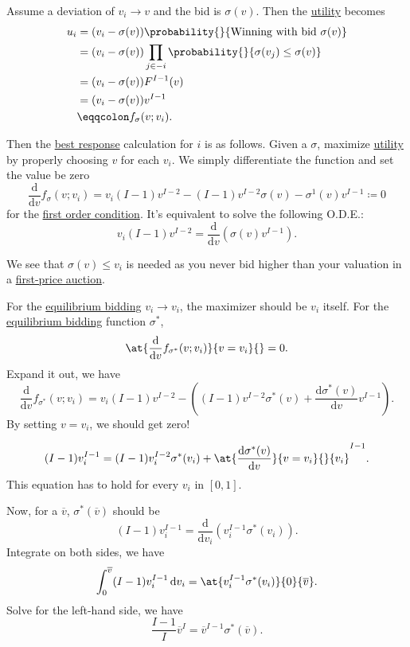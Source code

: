 Assume a deviation of \(v_{i}\to v\) and the bid is \(\sigma(v)\). Then the \hyperref[def:reward]{utility}  becomes
\[
	\begin{split}
		u_{i} &= (v_{i} - \sigma(v))\probability{}{ \text{Winning with bid } \sigma(v)}\\
		&= (v_{i} - \sigma(v))\prod\limits_{j\in -i}\probability{}{\sigma(v_{j})\leq \sigma(v)}\\
		&= (v_{i} - \sigma(v))F^{I-1}(v)\\
		&= (v_{i} - \sigma(v))v^{I-1}\\
		&\eqqcolon f_{\sigma}(v; v_{i}).
	\end{split}
\]

Then the \hyperref[def:best-response]{best response} calculation for \(i\) is as follows. Given a \(\sigma\), maximize \hyperref[def:reward]{utility}
by properly choosing \(v\) for each \(v_{i}\). We simply differentiate the function and set the value be zero
\[
	\frac{\mathrm{d}}{\mathrm{d}v}f_{\sigma}(v;v_{i}) = v_{i}(I - 1)v^{I-2} - (I - 1)v^{I-2}\sigma(v) - \sigma^1(v)v^{I-1} \coloneqq 0
\]
for the \underline{first order condition}. It's equivalent to solve the following O.D.E.:
\[
	v_{i}(I - 1)v^{I-2} = \frac{\mathrm{d}}{\mathrm{d}v} (\sigma(v)v^{I-1}).
\]

We see that \(\sigma(v)\leq v_{i}\) is needed as you never bid higher than your valuation in a \hyperref[eg:first-price-auction]{first-price auction}.

For the \hyperref[rmk:equilibrium-bidding]{equilibrium bidding} \(v_{i}\to v_{i}\), the maximizer should be \(v_{i}\) itself. For the
\hyperref[rmk:equilibrium-bidding]{equilibrium bidding} function \(\sigma^{\ast}\),
\[
	\at{\frac{\mathrm{d}}{\mathrm{d}v} f_{\sigma^{\ast}}(v;v_{i})}{v = v_{i}}{} = 0.
\]
Expand it out, we have
\[
	\frac{\mathrm{d}}{\mathrm{d}v} f_{\sigma^{\ast}}(v;v_{i}) = v_{i}(I - 1)v^{I-2} - \left((I - 1)v^{I-2}\sigma^{\ast}(v) + \frac{\mathrm{d}\sigma^{\ast}(v)}{\mathrm{d}v} v^{I-1}\right).
\]
By setting \(v = v_{i}\), we should get zero!

\[
	(I - 1)v_{i}^{I-1} = (I - 1)v_{i}^{I-2}\sigma^{\ast}(v_{i})+\at{\frac{\mathrm{d}\sigma^{\ast}(v)}{\mathrm{d}v}}{v = v_{i}}{}{v_{i}}^{I-1}.
\]
This equation has to hold for every \(v_{i}\) in \([0, 1]\).

Now, for a \(\overline{v}\), \(\sigma^{\ast}(\overline{v})\) should be
\[
	(I - 1)v_{i}^{I-1} = \frac{\mathrm{d}}{\mathrm{d}v_{i}} \left(v_{i}^{I-1}\sigma^{\ast}(v_{i})\right).
\]
Integrate on both sides, we have
\[
	\int_0^{\overline{v}}(I - 1)v_{i}^{I-1}\,\mathrm{d} v_{i} = \at{v_{i}^{I-1}\sigma^{\ast}(v_{i})}{0}{\overline{v}}.
\]
Solve for the left-hand side, we have
\[
	\frac{I - 1}{I}\overline{v}^I = \overline{v}^{I-1}\sigma^{\ast}(\overline{v}).
\]

